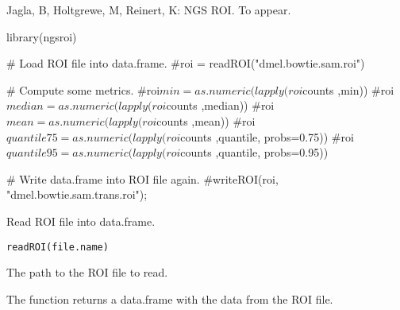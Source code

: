\documentclass[a4paper]{book}
\begin{document}
%
\begin{References}\relax
Jagla, B, Holtgrewe, M, Reinert, K: NGS ROI. To appear.
\end{References}
%
\begin{Examples}
\begin{ExampleCode}
library(ngsroi)

# Load ROI file into data.frame.
#roi = readROI("dmel.bowtie.sam.roi")

# Compute some metrics.
#roi$min = as.numeric(lapply(roi$counts ,min))
#roi$median =  as.numeric(lapply(roi$counts ,median))
#roi$mean =  as.numeric(lapply(roi$counts ,mean))
#roi$quantile75 =  as.numeric(lapply(roi$counts ,quantile, probs=0.75))
#roi$quantile95 =  as.numeric(lapply(roi$counts ,quantile, probs=0.95))

# Write data.frame into ROI file again.
#writeROI(roi, "dmel.bowtie.sam.trans.roi");
\end{ExampleCode}
\end{Examples}
%
\begin{Description}\relax
Read ROI file into data.frame.
\end{Description}
%
\begin{Usage}
\begin{verbatim}
readROI(file.name)
\end{verbatim}
\end{Usage}
%
\begin{Arguments}
\begin{ldescription}
\item[\code{file.name}] 
The path to the ROI file to read.

\end{ldescription}
\end{Arguments}
%
\begin{Value}
The function returns a data.frame with the data from the ROI file.
\end{Value}
%
\end{document}
